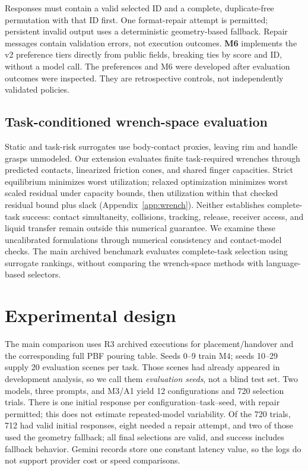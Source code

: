 \documentclass{article}
\begin{document}
Responses must contain a valid selected ID and a complete, duplicate-free permutation with that ID first. One format-repair attempt is permitted; persistent invalid output uses a deterministic geometry-based fallback. Repair messages contain validation errors, not execution outcomes. \textbf{M6} implements the v2 preference tiers directly from public fields, breaking ties by score and ID, without a model call. The preferences and M6 were developed after evaluation outcomes were inspected. They are retrospective controls, not independently validated policies.

\subsection{Task-conditioned wrench-space evaluation}
\label{sec:wrench}
Static and task-risk surrogates use body-contact proxies, leaving rim and handle grasps unmodeled. Our extension evaluates finite task-required wrenches through predicted contacts, linearized friction cones, and shared finger capacities. Strict equilibrium minimizes worst utilization; relaxed optimization minimizes worst scaled residual under capacity bounds, then utilization within that checked residual bound plus slack (Appendix~\ref{app:wrench}). Neither establishes complete-task success: contact simultaneity, collisions, tracking, release, receiver access, and liquid transfer remain outside this numerical guarantee. We examine these uncalibrated formulations through numerical consistency and contact-model checks. The main archived benchmark evaluates complete-task selection using surrogate rankings, without comparing the wrench-space methods with language-based selectors.

\section{Experimental design}
The main comparison uses R3 archived executions for placement/handover and the corresponding full PBF pouring table. Seeds 0--9 train M4; seeds 10--29 supply 20 evaluation scenes per task. Those scenes had already appeared in development analysis, so we call them \emph{evaluation seeds}, not a blind test set. Two models, three prompts, and M3/A1 yield 12 configurations and 720 selection trials. There is one initial response per configuration--task--seed, with repair permitted; this does not estimate repeated-model variability. Of the 720 trials, 712 had valid initial responses, eight needed a repair attempt, and two of those used the geometry fallback; all final selections are valid, and success includes fallback behavior. Gemini records store one constant latency value, so the logs do not support provider cost or speed comparisons.
\end{document}
